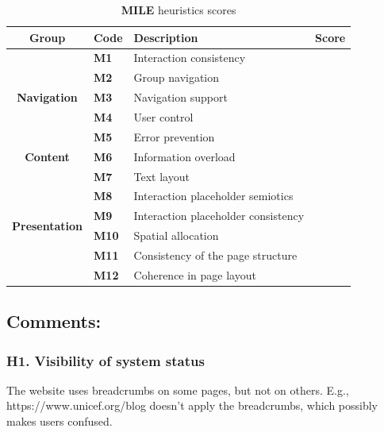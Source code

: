 \begin{table}[htp!]
	\centering
	\begin{tabular}{ |c|l|l|c| }
		\hline
		\textbf{Group} & \textbf{Code} & \textbf{Description} & \textbf{Score}\\
		\hline
		\multirow{5}{*}{\textbf{Navigation}} & \textbf{M1} & Interaction consistency & \textbf{\color{unicefGreen}{4}}\\
		\cline{2-4}
		& \textbf{M2} & Group navigation & \textbf{\color{unicefGreen}{4}}\\
		\cline{2-4}
		& \textbf{M3} & Navigation support & \textbf{\color{unicefGreen}{4}}\\
		\cline{2-4}
		& \textbf{M4} & User control & \textbf{\color{unicefGreen}{5}}\\
		\cline{2-4}
		& \textbf{M5} & Error prevention & \textbf{\color{unicefGreen}{4}}\\
		\hline
		\textbf{Content} & \textbf{M6} & Information overload & \textbf{\color{unicefGreen}{4}}\\
		\hline
		\multirow{6}{*}{\textbf{Presentation}} & \textbf{M7} & Text layout & \textbf{\color{unicefGreen}{5}}\\
		\cline{2-4}
		& \textbf{M8} & Interaction placeholder semiotics & \textbf{\color{unicefGreen}{4}}\\
		\cline{2-4}
		& \textbf{M9} & Interaction placeholder consistency & \textbf{\color{unicefGreen}{4}}\\
		\cline{2-4}
		& \textbf{M10} & Spatial allocation & \textbf{\color{unicefGreen}{4}}\\
		\cline{2-4}
		& \textbf{M11} & Consistency of the page structure & \textbf{\color{unicefGreen}{4}}\\
		\cline{2-4}
		& \textbf{M12} & Coherence in page layout & \textbf{\color{unicefGreen}{5}}\\
		\hline
	\end{tabular}
	\caption{\textbf{MILE} heuristics scores}
\end{table}

\subsection{Comments:}
\subsubsection{H1. Visibility of system status}
The website uses breadcrumbs on some pages, but not on others. E.g., https://www.unicef.org/blog doesn't apply the breadcrumbs, which possibly makes users confused.

